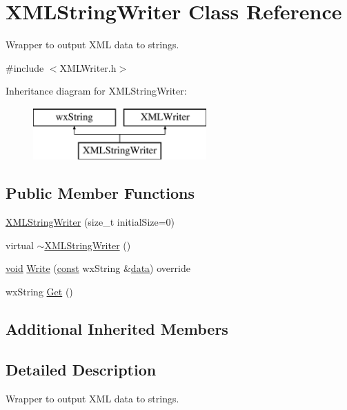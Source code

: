 \hypertarget{class_x_m_l_string_writer}{}\section{X\+M\+L\+String\+Writer Class Reference}
\label{class_x_m_l_string_writer}


Wrapper to output X\+ML data to strings.  




{\ttfamily \#include $<$X\+M\+L\+Writer.\+h$>$}

Inheritance diagram for X\+M\+L\+String\+Writer\+:\begin{figure}[H]
\begin{center}
\leavevmode
\includegraphics[height=2.000000cm]{class_x_m_l_string_writer}
\end{center}
\end{figure}
\subsection*{Public Member Functions}
\begin{DoxyCompactItemize}
\item 
\hyperlink{class_x_m_l_string_writer_a82e2f9352e6c128ff4638b844f9cbaa2}{X\+M\+L\+String\+Writer} (size\+\_\+t initial\+Size=0)
\item 
virtual \hyperlink{class_x_m_l_string_writer_a975f38c41512a433e5986876c1ae2b12}{$\sim$\+X\+M\+L\+String\+Writer} ()
\item 
\hyperlink{sound_8c_ae35f5844602719cf66324f4de2a658b3}{void} \hyperlink{class_x_m_l_string_writer_aa401f295b8c794ae00cbad87000ddc68}{Write} (\hyperlink{getopt1_8c_a2c212835823e3c54a8ab6d95c652660e}{const} wx\+String \&\hyperlink{lib_2expat_8h_ac39e72a1de1cb50dbdc54b08d0432a24}{data}) override
\item 
wx\+String \hyperlink{class_x_m_l_string_writer_ace0b72486fe444a5489397e841bf83ea}{Get} ()
\end{DoxyCompactItemize}
\subsection*{Additional Inherited Members}


\subsection{Detailed Description}
Wrapper to output X\+ML data to strings. 

